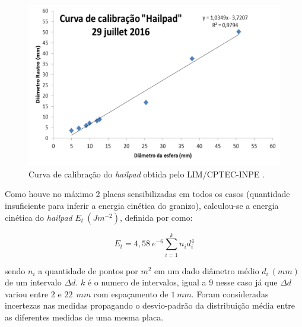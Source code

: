 \begin{figure}[htb]
	\begin{center}
		\caption{Curva de calibração do \textit{hailpad} obtida pelo LIM/CPTEC-INPE \cite{ThomazJunior2016}.} 
		\label{calibracao_hailpad}
		\includegraphics[width=0.7\columnwidth]{figs/calibracao_hailpad.png}
	\end{center}
\end{figure}

Como houve no máximo 2 placas sensibilizadas em todos os casos (quantidade insuficiente para inferir a energia cinética do granizo), calculou-se a energia cinética do \textit{hailpad} $E_t\:(Jm^{-2})$, definida por  como:

\begin{equation} \label{mezeix}
	E_t = 4,58\:e^{-6} \sum_{i=1}^{k} n_i d_i^4
\end{equation}

\noindent
sendo $n_i$ a quantidade de pontos por $m^2$ em um dado diâmetro médio $d_i\:(mm)$ de um intervalo $\Delta d$. $k$ é o numero de intervalos, igual a 9 nesse caso já que $\Delta d$ variou entre $2$ e $22\:\:mm$ com espaçamento de $1\:mm$. Foram consideradas incertezas nas medidas propagando o desvio-padrão da distribuição média entre as diferentes medidas de uma mesma placa.

